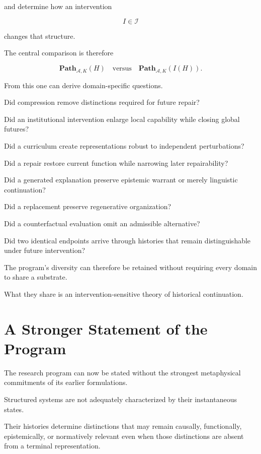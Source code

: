 \documentclass[11pt]{article}
\theoremstyle{remark}
\newcommand{\Adm}{\mathcal{A}}
\begin{document}
and determine how an intervention

\begin{equation}
I\in\mathcal{I}
\end{equation}

changes that structure.

The central comparison is therefore

\begin{equation}
\mathbf{Path}_{\Adm,K}(H)
\quad\text{versus}\quad
\mathbf{Path}_{\Adm,K}(I(H)).
\end{equation}

From this one can derive domain-specific questions.

Did compression remove distinctions required for future repair?

Did an institutional intervention enlarge local capability while closing global futures?

Did a curriculum create representations robust to independent perturbations?

Did a repair restore current function while narrowing later repairability?

Did a generated explanation preserve epistemic warrant or merely linguistic continuation?

Did a replacement preserve regenerative organization?

Did a counterfactual evaluation omit an admissible alternative?

Did two identical endpoints arrive through histories that remain distinguishable under future intervention?

The program's diversity can therefore be retained without requiring every domain to share a substrate.

What they share is an intervention-sensitive theory of historical continuation.

\section{A Stronger Statement of the Program}

The research program can now be stated without the strongest metaphysical commitments of its earlier formulations.

Structured systems are not adequately characterized by their instantaneous states.

Their histories determine distinctions that may remain causally, functionally, epistemically, or normatively relevant even when those distinctions are absent from a terminal representation.
\end{document}
